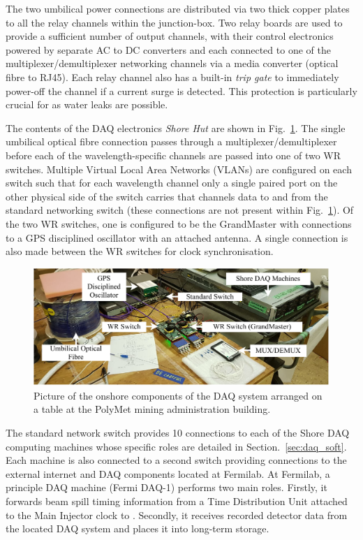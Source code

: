The two umbilical power connections are distributed via two thick copper plates to all the relay
channels within the junction-box. Two relay boards are used to provide a sufficient number of
output channels, with their control electronics powered by separate AC to DC converters and each
connected to one of the multiplexer/demultiplexer networking channels via a media converter
(optical fibre to RJ45). Each relay channel also has a built-in \emph{trip gate} to immediately
power-off the channel if a current surge is detected. This protection is particularly crucial for
\chipsfive as water leaks are possible.

The contents of the DAQ electronics \emph{Shore Hut} are shown in Fig.~\ref{fig:hut_daq}. The
single umbilical optical fibre connection passes through a multiplexer/demultiplexer before each
of the wavelength-specific channels are passed into one of two WR switches. Multiple Virtual Local
Area Networks (VLANs) are configured on each switch such that for each wavelength channel only a
single paired port on the other physical side of the switch carries that channels data to and from
the standard networking switch (these connections are not present within Fig.~\ref{fig:hut_daq}).
Of the two WR switches, one is configured to be the GrandMaster with connections to a GPS
disciplined oscillator with an attached antenna. A single connection is also made between the WR
switches for clock synchronisation.

\begin{figure} %
    \includegraphics[width=\textwidth]{diagrams/5-daq/hut_daq.pdf}
    \caption[Picture of the onshore components of the \chipsfive DAQ system]
    {Picture of the onshore components of the \chipsfive DAQ system arranged on a table at the
        PolyMet mining administration building.}
    \label{fig:hut_daq}
\end{figure}

The standard network switch provides \unit{10}{} connections to each of the Shore DAQ
computing machines whose specific roles are detailed in Section.~\ref{sec:daq_soft}. Each machine
is also connected to a second switch providing connections to the external internet and DAQ
components located at Fermilab. At Fermilab, a principle DAQ machine (Fermi DAQ-1) performs two
main roles. Firstly, it forwards \numi beam spill timing information from a Time Distribution Unit
attached to the Main Injector clock to \chipsfive. Secondly, it receives recorded detector data
from the \chipsfive located DAQ system and places it into long-term storage.


